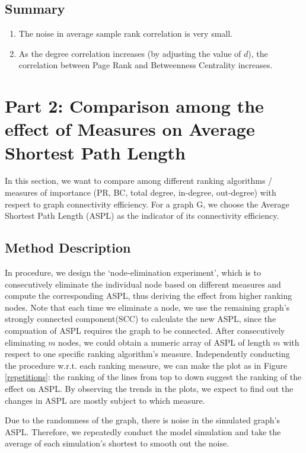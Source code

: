 \documentclass{article}
\begin{document}
\subsection{Summary}
\begin{enumerate}
\item The noise in average sample rank correlation is very small.
\item As the degree correlation increases (by adjusting the value of $d$), the correlation between Page Rank and Betweenness Centrality increases.
\end{enumerate}

\newpage

\section{Part 2:  Comparison among the effect of Measures on Average Shortest Path Length}
\par In this section,  we want to compare among different ranking algorithms / measures of importance (PR, BC, total degree, in-degree, out-degree) with respect to graph connectivity efficiency. For a graph G, we choose the Average Shortest Path Length (ASPL) as the indicator of its connectivity efficiency. 

\subsection{Method Description}
\quad
\par In procedure, we design the `node-elimination experiment', which is to consecutively eliminate the individual node based on different measures and compute the corresponding ASPL, thus deriving the effect from higher ranking nodes. Note that each time we eliminate a node, we use the remaining graph's strongly connected component(SCC) to calculate the new ASPL, since the compuation of ASPL requires the graph to be connected. After consecutively eliminating $m$ nodes, we could obtain a numeric array of ASPL of length $m$ with respect to one specific ranking algorithm's measure. Independently conducting the procedure w.r.t. each ranking measure,  we can make the plot as in Figure \ref{repetitions}: the ranking of the lines from top to down suggest the ranking of the effect on ASPL. By observing the trends in the plots, we expect to find out the changes in ASPL are mostly subject to which measure.
\par Due to the randomness of the graph, there is noise in the simulated graph's ASPL. Therefore, we repeatedly conduct the model simulation and take the average of each simulation's shortest to smooth out the noise.
\end{document}
